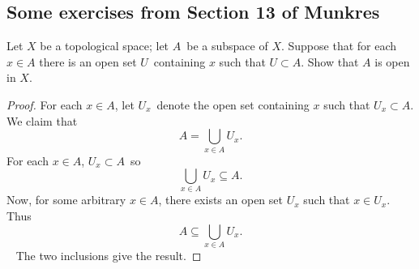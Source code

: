 \documentclass[11pt]{article}
\begin{document}
\subsection{Some exercises from Section 13 of Munkres}
\begin{prob}[Problem 1]
    Let $X$ be a topological space; let $A$ be a subspace of 
    $X$. Suppose that for each $x \in A$ there is an open set 
    $U$ containing $x$ such that $U \subset A$. Show that 
    $A$ is open in $X$. 
\end{prob}
\begin{proof}
    For each $x\in A$, let $U_x$ denote the open 
    set containing $x$ such that $U_x \subset A$. 
    We claim that 
    \[
        A = \bigcup_{x \in A} U_x.
    \]
    For each $x \in A$, $U_x \subset A$ so 
    \[
        \bigcup_{x \in A} U_x \subseteq A.
    \]
    Now, for some arbitrary $x \in A$, 
    there exists an open set $U_x$ such that 
    $x \in U_x$. Thus 
    \[ 
        A \subseteq \bigcup_{x \in A} U_x.
    \] 
    The two inclusions give the result.
\end{proof}
\end{document}
